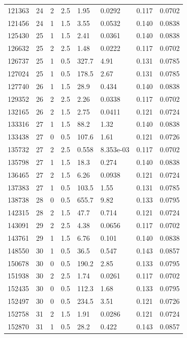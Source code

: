 \documentclass[preview]{standalone}
\begin{document}
{{{\begin{tabular}{L{1.2cm}C{1.2cm} C{0.3cm}C{0.5cm} C{1.4cm}C{1.4cm} C{1.4cm}C{1.4cm}}
  121363  &    24  & 2     & 2.5 &  1.95  & 0.0292  & 0.117 &  0.0702   \\ 
  121456  &    24  & 1     & 1.5 &  3.55  & 0.0532  & 0.140 &  0.0838   \\ 
  125430  &    25  & 1     & 1.5 &  2.41  & 0.0361  & 0.140 &  0.0838   \\ 
  126632  &    25  & 2     & 2.5 &  1.48  & 0.0222  & 0.117 &  0.0702   \\ 
  126737  &    25  & 1     & 0.5 &  327.7  & 4.91  & 0.131 &  0.0785   \\ 
  127024  &    25  & 1     & 0.5 &  178.5  & 2.67  & 0.131 &  0.0785   \\ 
  127740  &    26  & 1     & 1.5 &  28.9  & 0.434  & 0.140 &  0.0838   \\ 
  129352  &    26  & 2     & 2.5 &  2.26  & 0.0338  & 0.117 &  0.0702   \\ 
  132165  &    26  & 2     & 1.5 &  2.75  & 0.0411  & 0.121 &  0.0724   \\ 
  133316  &    27  & 1     & 1.5 &  88.2  & 1.32  & 0.140 &  0.0838   \\ 
  133438  &    27  & 0     & 0.5 &  107.6  & 1.61  & 0.121 &  0.0726   \\ 
  135732  &    27  & 2     & 2.5 &  0.558  & 8.353e-03  & 0.117 &  0.0702   \\ 
  135798  &    27  & 1     & 1.5 &  18.3  & 0.274  & 0.140 &  0.0838   \\ 
  136465  &    27  & 2     & 1.5 &  6.26  & 0.0938  & 0.121 &  0.0724   \\ 
  137383  &    27  & 1     & 0.5 &  103.5  & 1.55  & 0.131 &  0.0785   \\ 
  138738  &    28  & 0     & 0.5 &  655.7  & 9.82  & 0.133 &  0.0795   \\ 
  142315  &    28  & 2     & 1.5 &  47.7  & 0.714  & 0.121 &  0.0724   \\ 
  143091  &    29  & 2     & 2.5 &  4.38  & 0.0656  & 0.117 &  0.0702   \\ 
  143761  &    29  & 1     & 1.5 &  6.76  & 0.101  & 0.140 &  0.0838   \\ 
  148550  &    30  & 1     & 0.5 &  36.5  & 0.547  & 0.143 &  0.0857   \\ 
  150678  &    30  & 0     & 0.5 &  190.2  & 2.85  & 0.133 &  0.0795   \\ 
  151938  &    30  & 2     & 2.5 &  1.74  & 0.0261  & 0.117 &  0.0702   \\ 
  152435  &    30  & 0     & 0.5 &  112.3  & 1.68  & 0.133 &  0.0795   \\ 
  152497  &    30  & 0     & 0.5 &  234.5  & 3.51  & 0.121 &  0.0726   \\ 
  152758  &    31  & 2     & 1.5 &  1.91  & 0.0286  & 0.121 &  0.0724   \\ 
  152870  &    31  & 1     & 0.5 &  28.2  & 0.422  & 0.143 &  0.0857   \\ 
\hline 
\end{tabular} 

}}}
\end{document}
